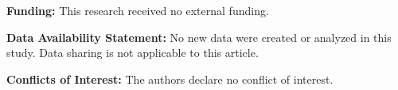 \documentclass[11pt,a4paper]{article}
\begin{document}
\noindent\textbf{Funding:} This research received no external funding.

\noindent\textbf{Data Availability Statement:} No new data were created or
analyzed in this study. Data sharing is not applicable to this article.

\noindent\textbf{Conflicts of Interest:} The authors declare no conflict of
interest.



\end{document}
